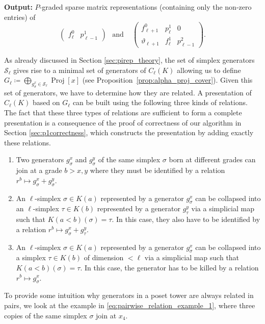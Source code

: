 \documentclass[english,a4paper,nolineno,cleveref]{socg-lipics-v2021}
\DeclareMathOperator{\proj}{Proj}
\begin{document}
\noindent
\textbf{Output:} $P$-graded sparse matrix representations (containing only the non-zero entries) of 
\begin{equation*}
\begin{pmatrix}f_\ell^0 & p^1_{\ell\minus 1}\end{pmatrix}  \hspace{5pt} \text{ and } \hspace{10pt} \begin{pmatrix}f_{\ell+1}^0 & p^1_{\ell} & 0 \\  \vartheta_{\ell+1} & f^1_{\ell} & p^2_{\ell\minus 1} \end{pmatrix}.
\end{equation*}


As already discussed in Section \ref{sec:pirep_theory}, the set of simplex generators $\mathcal{S}_\ell$ gives rise to a minimal set of generators of $C_\ell(K)$ allowing us to define $G_\ell\coloneqq\bigoplus_{g_\sigma^x\in\mathcal{S}_\ell}\proj[x]$ (see Proposition~\ref{prop:alpha_proj_cover}). Given this set of generators, we have to determine how they are related. A presentation of $C_\ell(K)$ based on $G_\ell$ can be built using the following three kinds of relations. The fact that these three types of relations are sufficient to form a complete presentation is a consequence of the proof of correctness of our algorithm in Section \ref{sec:p1correctness}, which constructs the presentation by adding exactly these relations.
\begin{enumerate}
    \item Two generators $g_\sigma^x$ and $g_\sigma^y$ of the same simplex $\sigma$ born at different grades can join at a grade $b>x,y$ where they must be identified by a relation $r^b\mapsto g_\sigma^x+g_\sigma^y$.
    \item An $\ell$-simplex $\sigma\in K(a)$ represented by a generator $g_\sigma^x$ can be collapsed into an $\ell$-simplex $\tau\in K(b)$ represented by a generator $g_\tau^y$ via a simplicial map such that $K(a<b)(\sigma)=\tau$. In this case, they also have to be identified by a relation $r^b\mapsto g_\sigma^x+g_\tau^y$.
    \item An $\ell$-simplex $\sigma\in K(a)$ represented by a generator $g_\sigma^x$ can be collapsed into a simplex $\tau\in K(b)$ of dimension $<\ell$ via a simplicial map such that $K(a<b)(\sigma)=\tau$. In this case, the generator has to be killed by a relation $r^b\mapsto g_\sigma^x$.
\end{enumerate}
To provide some intuition why generators in a poset tower are always related in pairs, we look at the example in \eqref{eq:pairwise_relation_example_1}, where three copies of the same simplex $\sigma$ join at $x_4$. 
\end{document}

